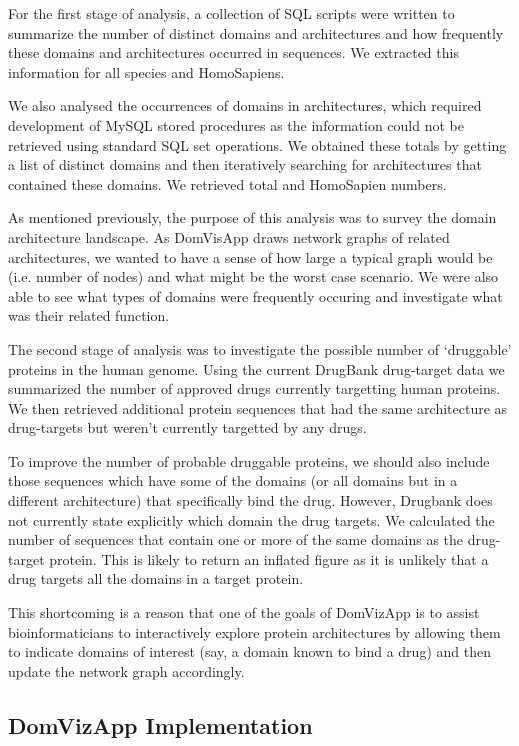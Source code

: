 For the first stage of analysis, a collection of SQL scripts were written to summarize the number of distinct domains and architectures and how frequently these domains and architectures occurred in sequences. We extracted this information for all species and HomoSapiens.

We also analysed the occurrences of domains in architectures, which required development of MySQL stored procedures as the information could not be retrieved using standard SQL set operations. We obtained these totals by getting a list of distinct domains and then iteratively searching for architectures that contained these domains. We retrieved total and HomoSapien numbers.

As mentioned previously, the purpose of this analysis was to survey the domain architecture landscape. As DomVisApp draws network graphs of related architectures, we wanted to have a sense of how large a typical graph would be (i.e. number of nodes) and what might be the worst case scenario. We were also able to see what types of domains were frequently occuring and investigate what was their related function.

The second stage of analysis was to investigate the possible number of `druggable' proteins in the human genome. Using the current DrugBank drug-target data we summarized the number of approved drugs currently targetting human proteins. We then retrieved additional protein sequences that had the same architecture as drug-targets but weren't currently targetted by any drugs.

To improve the number of probable druggable proteins, we should also include those sequences which have some of the domains (or all domains but in a different architecture) that specifically bind the drug. However, Drugbank does not currently state explicitly which domain the drug targets. We calculated the number of sequences that contain one or more of the same domains as the drug-target protein. This is likely to return an inflated figure as it is unlikely that a drug targets all the domains in a target protein.

This shortcoming is a reason that one of the goals of DomVizApp is to assist bioinformaticians to interactively explore protein architectures by allowing them to indicate domains of interest (say, a domain known to bind a drug) and then update the network graph accordingly.

\subsection{DomVizApp Implementation}


